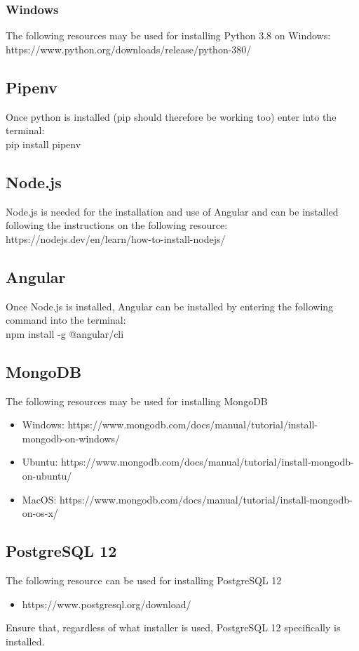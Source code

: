 \documentclass{article}
\begin{document}
\subsubsection{Windows}
The following resources may be used for installing Python 3.8 on Windows:
https://www.python.org/downloads/release/python-380/

\subsection{Pipenv}
Once python is installed (pip should therefore be working too) enter into the terminal:\\
pip install pipenv

\subsection{Node.js}
Node.js is needed for the installation and use of Angular and can be installed
following the instructions on the following resource:\\
https://nodejs.dev/en/learn/how-to-install-nodejs/

\subsection{Angular}
Once Node.js is installed, Angular can be installed by entering the following command into the terminal:\\
npm install -g @angular/cli

\subsection{MongoDB}
The following resources may be used for installing MongoDB
\begin{itemize}
    \item Windows: https://www.mongodb.com/docs/manual/tutorial/install-mongodb-on-windows/
    \item Ubuntu: https://www.mongodb.com/docs/manual/tutorial/install-mongodb-on-ubuntu/
    \item MacOS: https://www.mongodb.com/docs/manual/tutorial/install-mongodb-on-os-x/
\end{itemize}

\subsection{PostgreSQL 12}
The following resource can be used for installing PostgreSQL 12
\begin{itemize}
    \item https://www.postgresql.org/download/
\end{itemize}
Ensure that, regardless of what installer is used, PostgreSQL 12 specifically is installed.
\end{document}
